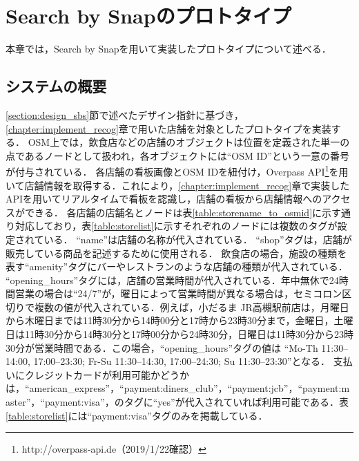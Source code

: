 \chapter{Search by Snapのプロトタイプ}
\label{chapter:implement_sbs}
本章では，Search by Snapを用いて実装したプロトタイプについて述べる．

\section{システムの概要}
  \ref{section:design_sbs}節で述べたデザイン指針に基づき，\ref{chapter:implement_recog}章で用いた店舗を対象としたプロトタイプを実装する．
  OSM上では，飲食店などの店舗のオブジェクトは位置を定義された単一の点であるノードとして扱われ，各オブジェクトには``OSM ID''という一意の番号が付与されている．
  各店舗の看板画像とOSM IDを紐付け，Overpass API\footnote{http://overpass-api.de（2019/1/22確認）}を用いて店舗情報を取得する．これにより，\ref{chapter:implement_recog}章で実装したAPIを用いてリアルタイムで看板を認識し，店舗の看板から店舗情報へのアクセスができる．
  各店舗の店舗名とノードは表\ref{table:storename_to_osmid}に示す通り対応しており，表\ref{table:storelist}に示すそれぞれのノードには複数のタグが設定されている．
  ``name''は店舗の名称が代入されている．
  ``shop''タグは，店舗が販売している商品を記述するために使用される．
  飲食店の場合，施設の種類を表す``amenity''タグにバーやレストランのような店舗の種類が代入されている．
  ``opening\_hours''タグには，店舗の営業時間が代入されている．年中無休で24時間営業の場合は``24/7''が，曜日によって営業時間が異なる場合は，セミコロン区切りで複数の値が代入されている．例えば，小だるま JR高槻駅前店は，月曜日から木曜日までは11時30分から14時00分と17時から23時30分まで，金曜日，土曜日は11時30分から14時30分と17時00分から24時30分，日曜日は11時30分から23時30分が営業時間である．この場合，``opening\_hours''タグの値は
  ``Mo-Th 11:30--14:00, 17:00--23:30; Fr-Su 11:30--14:30, 17:00--24:30; Su 11:30--23:30''となる．
  支払いにクレジットカードが利用可能かどうかは，``american\_express''，``payment:diners\_club''，``payment:jcb''，``payment:master''，``payment:visa''，のタグに``yes''が代入されていれば利用可能である．表\ref{table:storelist}には``payment:visa''タグのみを掲載している．

